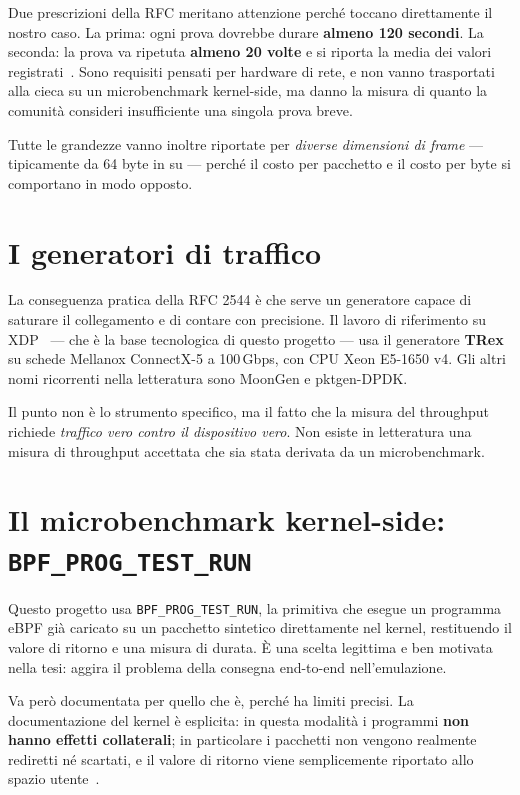 \documentclass[11pt,a4paper,oneside]{report}
\begin{document}
Due prescrizioni della RFC meritano attenzione perché toccano
direttamente il nostro caso. La prima: ogni prova dovrebbe durare
\textbf{almeno 120 secondi}. La seconda: la prova va ripetuta
\textbf{almeno 20 volte} e si riporta la media dei valori
registrati~\cite{rfc2544}. Sono requisiti pensati per hardware di
rete, e non vanno trasportati alla cieca su un microbenchmark
kernel-side, ma danno la misura di quanto la comunità consideri
insufficiente una singola prova breve.

Tutte le grandezze vanno inoltre riportate per \emph{diverse dimensioni
di frame} --- tipicamente da 64 byte in su --- perché il costo per
pacchetto e il costo per byte si comportano in modo opposto.

\section{I generatori di traffico}

La conseguenza pratica della RFC 2544 è che serve un generatore capace
di saturare il collegamento e di contare con precisione. Il lavoro di
riferimento su XDP~\cite{hoiland18xdp} --- che è la base tecnologica
di questo progetto --- usa il generatore \textbf{TRex} su schede
Mellanox ConnectX-5 a 100\,Gbps, con CPU Xeon E5-1650 v4. Gli altri
nomi ricorrenti nella letteratura sono MoonGen e pktgen-DPDK.

Il punto non è lo strumento specifico, ma il fatto che la misura del
throughput richiede \emph{traffico vero contro il dispositivo vero}.
Non esiste in letteratura una misura di throughput accettata che sia
stata derivata da un microbenchmark.

\section{Il microbenchmark kernel-side: \texttt{BPF\_PROG\_TEST\_RUN}}

Questo progetto usa \texttt{BPF\_PROG\_TEST\_RUN}, la primitiva che
esegue un programma eBPF già caricato su un pacchetto sintetico
direttamente nel kernel, restituendo il valore di ritorno e una misura
di durata. È una scelta legittima e ben motivata nella tesi: aggira il
problema della consegna end-to-end nell'emulazione.

Va però documentata per quello che è, perché ha limiti precisi. La
documentazione del kernel è esplicita: in questa modalità i programmi
\textbf{non hanno effetti collaterali}; in particolare i pacchetti non
vengono realmente rediretti né scartati, e il valore di ritorno viene
semplicemente riportato allo spazio utente~\cite{kerneldocs}.
\end{document}
